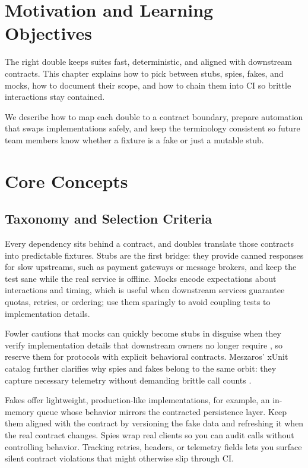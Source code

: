 \section{Motivation and Learning Objectives}
The right double keeps suites fast, deterministic, and aligned with downstream contracts. This chapter explains how to pick between stubs, spies, fakes, and mocks, how to document their scope, and how to chain them into CI so brittle interactions stay contained.

We describe how to map each double to a contract boundary, prepare automation that swaps implementations safely, and keep the terminology consistent so future team members know whether a fixture is a fake or just a mutable stub.

\section{Core Concepts}
\subsection{Taxonomy and Selection Criteria}
Every dependency sits behind a contract, and doubles translate those contracts into predictable fixtures. Stubs are the first bridge: they provide canned responses for slow upstreams, such as payment gateways or message brokers, and keep the test sane while the real service is offline. Mocks encode expectations about interactions and timing, which is useful when downstream services guarantee quotas, retries, or ordering; use them sparingly to avoid coupling tests to implementation details.

Fowler cautions that mocks can quickly become stubs in disguise when they verify implementation details that downstream owners no longer require \citep{fowler2007mocks}, so reserve them for protocols with explicit behavioral contracts. Meszaros' xUnit catalog further clarifies why spies and fakes belong to the same orbit: they capture necessary telemetry without demanding brittle call counts \citep{meszaros2007xunit}.

Fakes offer lightweight, production-like implementations, for example, an in-memory queue whose behavior mirrors the contracted persistence layer. Keep them aligned with the contract by versioning the fake data and refreshing it when the real contract changes. Spies wrap real clients so you can audit calls without controlling behavior. Tracking retries, headers, or telemetry fields lets you surface silent contract violations that might otherwise slip through CI.

